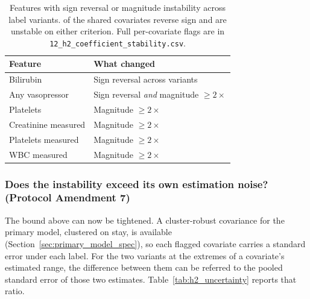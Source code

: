 \begin{table}[H]
    \centering
    \begin{tabular}{lp{8cm}}
        \toprule
        \textbf{Feature}           & \textbf{What changed}                   \\
        \midrule
        Bilirubin                  & Sign reversal across variants           \\
        Any vasopressor            & Sign reversal \emph{and} magnitude $\geq 2\times$ \\
        Platelets                  & Magnitude $\geq 2\times$                \\
        Creatinine measured        & Magnitude $\geq 2\times$                \\
        Platelets measured         & Magnitude $\geq 2\times$                \\
        WBC measured               & Magnitude $\geq 2\times$                \\
        \bottomrule
    \end{tabular}
    \caption{Features with sign reversal or magnitude instability across label
    variants. \pcHTwoNSign{} of the \pcHTwoNTerms{} shared covariates reverse
    sign and \pcHTwoEst{} are unstable on either criterion. Full per-covariate
    flags are in \texttt{12\_h2\_coefficient\_stability.csv}.}
    \label{tab:coef_instability}
\end{table}

\subsubsection{Does the instability exceed its own estimation noise? (Protocol
Amendment 7)}
\label{sec:h2_uncertainty}

The bound above can now be tightened. A cluster-robust covariance for the
primary model, clustered on stay, is available
(Section~\ref{sec:primary_model_spec}), so each flagged covariate carries a
standard error under each label. For the two variants at the extremes of a
covariate's estimated range, the difference between them can be referred to the
pooled standard error of those two estimates. Table~\ref{tab:h2_uncertainty}
reports that ratio.

